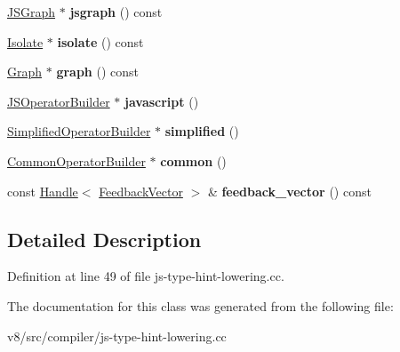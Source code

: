 \begin{DoxyCompactItemize}
\mbox{\label{classv8_1_1internal_1_1compiler_1_1JSSpeculativeBinopBuilder_a75ffe13438b07a9a44c7455b0efe797f}} 
\mbox{\hyperlink{classv8_1_1internal_1_1compiler_1_1JSGraph}{J\+S\+Graph}} $\ast$ {\bfseries jsgraph} () const
\item 
\mbox{\label{classv8_1_1internal_1_1compiler_1_1JSSpeculativeBinopBuilder_a82411df8ecd442a69e65573499cad72d}} 
\mbox{\hyperlink{classv8_1_1internal_1_1Isolate}{Isolate}} $\ast$ {\bfseries isolate} () const
\item 
\mbox{\label{classv8_1_1internal_1_1compiler_1_1JSSpeculativeBinopBuilder_a55c8ff15b1bc93ee8567899afcdaa2e6}} 
\mbox{\hyperlink{classv8_1_1internal_1_1compiler_1_1Graph}{Graph}} $\ast$ {\bfseries graph} () const
\item 
\mbox{\label{classv8_1_1internal_1_1compiler_1_1JSSpeculativeBinopBuilder_a9d3a405054fdbc60013f1abcad085b9e}} 
\mbox{\hyperlink{classv8_1_1internal_1_1compiler_1_1JSOperatorBuilder}{J\+S\+Operator\+Builder}} $\ast$ {\bfseries javascript} ()
\item 
\mbox{\label{classv8_1_1internal_1_1compiler_1_1JSSpeculativeBinopBuilder_a582b5bdbeace0a7481b211fa516e59f7}} 
\mbox{\hyperlink{classv8_1_1internal_1_1compiler_1_1SimplifiedOperatorBuilder}{Simplified\+Operator\+Builder}} $\ast$ {\bfseries simplified} ()
\item 
\mbox{\label{classv8_1_1internal_1_1compiler_1_1JSSpeculativeBinopBuilder_aa38e6ead259baa230efc143c9bc84627}} 
\mbox{\hyperlink{classv8_1_1internal_1_1compiler_1_1CommonOperatorBuilder}{Common\+Operator\+Builder}} $\ast$ {\bfseries common} ()
\item 
\mbox{\label{classv8_1_1internal_1_1compiler_1_1JSSpeculativeBinopBuilder_adeef41efa23c7c71ebaffed0d212aff8}} 
const \mbox{\hyperlink{classv8_1_1internal_1_1Handle}{Handle}}$<$ \mbox{\hyperlink{classv8_1_1internal_1_1FeedbackVector}{Feedback\+Vector}} $>$ \& {\bfseries feedback\+\_\+vector} () const
\end{DoxyCompactItemize}


\subsection{Detailed Description}


Definition at line 49 of file js-\/type-\/hint-\/lowering.\+cc.



The documentation for this class was generated from the following file\+:\begin{DoxyCompactItemize}
\item 
v8/src/compiler/js-\/type-\/hint-\/lowering.\+cc\end{DoxyCompactItemize}
